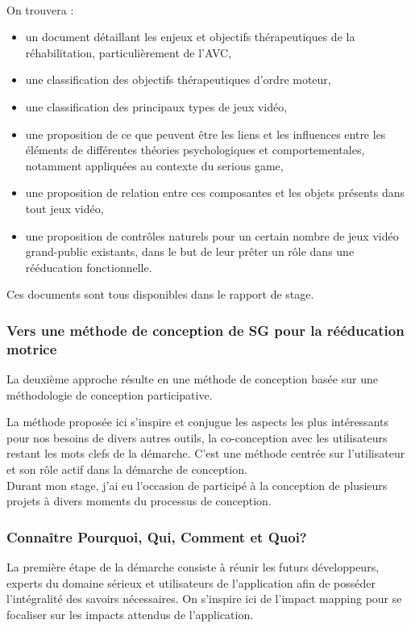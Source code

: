 \documentclass[french, 12pt]{article} %
\begin{document}
\paragraph{} On trouvera : 
\begin{itemize}
	\item un document détaillant les enjeux et objectifs thérapeutiques de la réhabilitation, particulièrement de l'AVC,
	\item une classification des objectifs thérapeutiques d'ordre moteur,
	\item une classification des principaux types de jeux vidéo,
	\item une proposition de ce que peuvent être les liens et les influences entre les éléments de différentes théories psychologiques et comportementales, notamment appliquées au contexte du serious game,
	\item une proposition de relation entre ces composantes et les objets présents dans tout jeux vidéo,
	\item une proposition de contrôles naturels pour un certain nombre de jeux vidéo grand-public existants, dans le but de leur prêter un rôle dans une rééducation fonctionnelle.
\end{itemize}
Ces documents sont tous disponibles dans le rapport de stage.

		\subsubsection{Vers une méthode de conception de SG pour la rééducation motrice}
La deuxième approche résulte en une méthode de conception basée sur une méthodologie de conception participative.

La méthode proposée ici s'inspire et conjugue les aspects les plus intéressants pour nos besoins de divers autres outils, la co-conception avec les utilisateurs restant les mots clefs de la démarche. C'est une méthode centrée sur l'utilisateur et son rôle actif dans la démarche de conception. \\
Durant mon stage, j'ai eu l'occasion de participé à la conception de plusieurs projets à divers moments du processus de conception.

\subsubsection*{Connaître Pourquoi, Qui, Comment et Quoi?}
La première étape de la démarche consiste à réunir les futurs développeurs, experts du domaine sérieux et utilisateurs de l'application afin de posséder l'intégralité des savoirs nécessaires.  On s'inspire ici de l'impact mapping pour se focaliser sur les impacts attendus de l'application.
\end{document}
